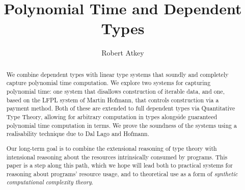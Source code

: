 \documentclass[acmsmall,screen]{acmart}
\begin{document}
\title{Polynomial Time and Dependent Types}

\author{Robert Atkey}



\begin{abstract}
  We combine dependent types with linear type systems that soundly and
  completely capture polynomial time computation. We explore two
  systems for capturing polynomial time: one system that disallows
  construction of iterable data, and one, based on the LFPL system of
  Martin Hofmann, that controls construction via a payment
  method. Both of these are extended to full dependent types via
  Quantitative Type Theory, allowing for arbitrary computation in
  types alongside guaranteed polynomial time computation in terms. We
  prove the soundness of the systems using a realisability technique
  due to Dal Lago and Hofmann.

  Our long-term goal is to combine the extensional reasoning of type
  theory with intensional reasoning about the resources intrinsically
  consumed by programs. This paper is a step along this path, which we
  hope will lead both to practical systems for reasoning about
  programs' resource usage, and to theoretical use as a form of
  \emph{synthetic computational complexity theory}.
\end{abstract}
\end{document}
